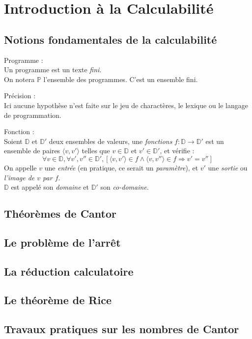 \chapter{Introduction \`a la Calculabilit\'e}\label{chap:introduction}
    \section{Notions fondamentales de la calculabilit\'e}\label{sec:notions_fondamentales}
    \begin{definition}
        Programme :\\
        Un programme est un texte \emph{fini}.\\
        On notera \(\mathbb{P}\) l'ensemble des programmes. C'est un ensemble fini.\\
        \begin{Note}
            Précision :\\
            Ici aucune hypoth\`ese n'est faite sur le jeu de charact\`eres, le lexique ou le langage de programmation.
        \end{Note}
    \end{definition}
    \begin{definition}
        Fonction :\\
        Soient \(\mathbb{D}\) et \(\mathbb{D'}\) deux ensembles de valeurs, une \emph{fonctions} \(f:\mathbb{D}\rightarrow\mathbb{D'}\) est un ensemble de paires \(\langle v,v'\rangle\) telles que \(v\in\mathbb{D}\) et \(v'\in\mathbb{D'}\), et vérifie :
        \begin{equation}
            \forall v\in\mathbb{D}, \forall v',v''\in\mathbb{D'}, \left[\langle v,v'\rangle\in f\wedge\langle v,v''\rangle\in f \Rightarrow v'=v''\right]
        \end{equation}
        On appelle \(v\) une \emph{entrée} (en pratique, ce serait un \emph{paramètre}), et \(v'\) une \emph{sortie} ou \emph{l'image de \(v\) par \(f\)}.\\
        \(\mathbb{D}\) est appelé son \emph{domaine} et \(\mathbb{D'}\) son \emph{co-domaine}.
    \end{definition}
  
  \section{Th\'eor\`emes de Cantor}\label{sec:theoremes_cantor}
  
  
  \section{Le probl\`eme de l'arrêt}\label{sec:probleme_arret}
  
  
  \section{La r\'eduction calculatoire}\label{sec:reduction_calculatoire}
  
  
  \section{Le th\'eor\`eme de Rice}\label{sec:theoreme_rice}
 
  
  \section{Travaux pratiques sur les nombres de Cantor}\label{sec:tp_cantor}